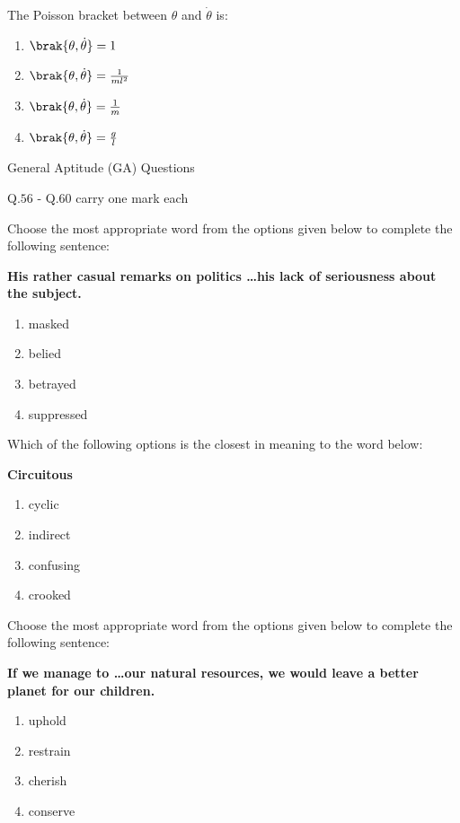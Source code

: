  
    \item The Poisson bracket between $ \theta $ and $ \dot{\theta} $ is:

    \begin{enumerate}
        \item $\brak{\theta, \dot{\theta}} = 1$
        \item $\brak{\theta, \dot{\theta}} = \frac{1}{m l^2}$
         \item $\brak{\theta, \dot{\theta}} = \frac{1}{m}$
        \item $\brak{\theta, \dot{\theta}} = \frac{g}{l}$
    \end{enumerate}

   
General Aptitude (GA) Questions


Q.$56$ - Q.$60$ carry one mark each


    \item Choose the most appropriate word from the options given below to complete the following sentence:

   \textbf{ His rather casual remarks on politics \dots his lack of seriousness about the subject.}

    \begin{enumerate}
        \item masked
        \item belied
        \item betrayed
        \item suppressed
    \end{enumerate}

    \item Which of the following options is the closest in meaning to the word below: 

    \textbf{Circuitous}

    \begin{enumerate}
        \item cyclic
        \item indirect
        \item confusing
        \item crooked
    \end{enumerate}

    \item Choose the most appropriate word from the options given below to complete the following sentence:

   \textbf{ If we manage to \dots  our natural resources, we would leave a better planet for our children.}

    \begin{enumerate}
        \item uphold
        \item restrain
        \item cherish
        \item conserve
    \end{enumerate}

